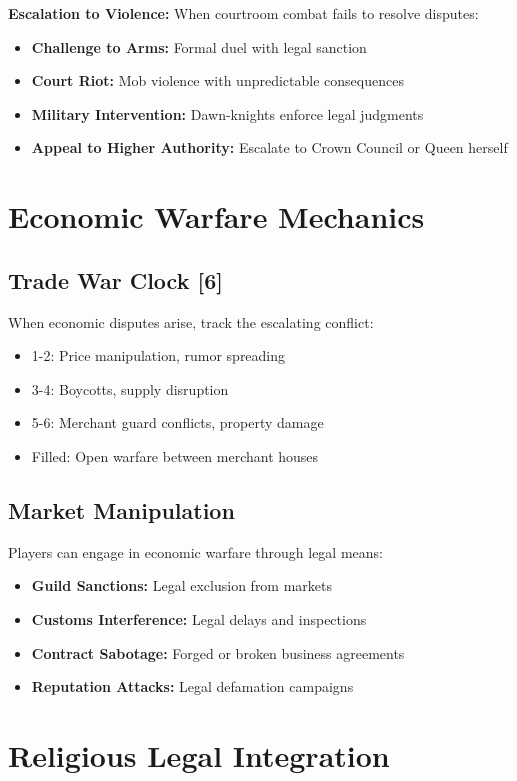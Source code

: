 \textbf{Escalation to Violence:}
When courtroom combat fails to resolve disputes:
\begin{itemize}
\item \textbf{Challenge to Arms:} Formal duel with legal sanction
\item \textbf{Court Riot:} Mob violence with unpredictable consequences
\item \textbf{Military Intervention:} Dawn-knights enforce legal judgments
\item \textbf{Appeal to Higher Authority:} Escalate to Crown Council or Queen herself
\end{itemize}

\section*{Economic Warfare Mechanics}

\subsection*{Trade War Clock [6]}
When economic disputes arise, track the escalating conflict:
\begin{itemize}
\item 1-2: Price manipulation, rumor spreading
\item 3-4: Boycotts, supply disruption
\item 5-6: Merchant guard conflicts, property damage
\item Filled: Open warfare between merchant houses
\end{itemize}

\subsection*{Market Manipulation}
Players can engage in economic warfare through legal means:
\begin{itemize}
\item \textbf{Guild Sanctions:} Legal exclusion from markets
\item \textbf{Customs Interference:} Legal delays and inspections
\item \textbf{Contract Sabotage:} Forged or broken business agreements
\item \textbf{Reputation Attacks:} Legal defamation campaigns
\end{itemize}

\section*{Religious Legal Integration}

